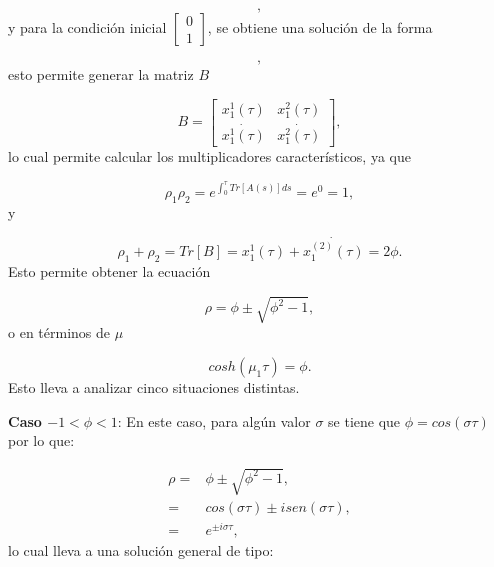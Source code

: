 \documentclass[a4paper,10pt]{report}
\begin{document}
\begin{equation}
[\begin{array}{c}
x_1^1(t) \\
\dot{x_1^1(t)}
\end{array}],
\end{equation} y para la condición inicial $[\begin{array}{c} 0 \\ 1 \end{array}]$, se obtiene una solución de la forma

\begin{equation}
[\begin{array}{c}
x_1^2(t) \\
\dot{x_1^2(t)}
\end{array}],
\end{equation} esto permite generar la matriz $B$

\begin{equation}
B= [\begin{array}{cc}

x_1^1(\tau) & x_1^2(\tau) \\
\dot{x_1^1(\tau)} & \dot{x_1^2(\tau)}

\end{array}],
\end{equation} lo cual permite calcular los multiplicadores característicos, ya que

\begin{equation}
\rho_1 \rho_2 = e^{\int_0^\tau Tr[A(s)]ds} = e^0 = 1,
\end{equation} y

\begin{equation}
\rho_1 + \rho_2 = Tr[B] =x_1^1(\tau)+ \dot{x_1^{(2)}(\tau)} = 2\phi.
\end{equation} Esto permite obtener la ecuación

\begin{equation}
\rho = \phi \pm \sqrt{\phi^2 -1},
\end{equation} o en términos de $\mu$

\begin{equation}
cosh(\mu_1 \tau) = \phi.
\end{equation} Esto lleva a analizar cinco situaciones distintas.

\textbf{Caso $ -1 < \phi < 1$}: En este caso, para algún valor $\sigma$ se tiene que $\phi = cos(\sigma \tau)$ por lo que:

\begin{align*}
\rho =& \phi \pm \sqrt{\phi^2 -1},\\
=& cos(\sigma \tau) \pm isen(\sigma \tau), \\
=& e^{\pm i\sigma \tau},
\end{align*} lo cual lleva a una solución general de tipo:
\end{document}
